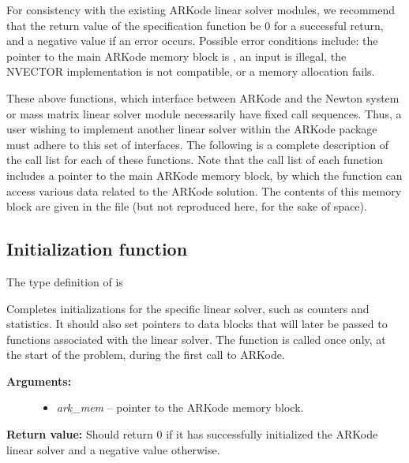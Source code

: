 \documentclass[letterpaper,10pt,english]{sphinxmanual}
\begin{document}
For consistency with the existing ARKode linear solver modules, we
recommend that the return value of the specification function be 0 for
a successful return, and a negative value if an error occurs.
Possible error conditions include: the pointer to the main ARKode
memory block is , an input is illegal, the NVECTOR
implementation is not compatible, or a memory allocation fails.

These above functions, which interface between ARKode and the Newton
system or mass matrix linear solver module necessarily have fixed call
sequences.  Thus, a user wishing to implement another linear solver
within the ARKode package must adhere to this set of interfaces.  The
following is a complete description of the call list for each of these
functions.  Note that the call list of each function includes a pointer
to the main ARKode memory block, by which the function can access
various data related to the ARKode solution. The contents of this
memory block are given in the file  (but not
reproduced here, for the sake of space).


\subsection{Initialization function}
\label{linear_solvers/custom:initialization-function}
The type definition of {\hyperref[linear_solvers/custom:c.linit]{\emph{}}} is

\begin{fulllineitems}
\label{linear_solvers/custom:c.linit}
Completes initializations for the specific linear solver, such as
counters and statistics.  It should also set pointers to data
blocks that will later be passed to functions associated with the
linear solver.  The {\hyperref[linear_solvers/custom:c.linit]{\emph{}}} function is called once only,
at the start of the problem, during the first call to ARKode.
\begin{description}
\item[{\textbf{Arguments:}}] \leavevmode\begin{itemize}
\item {} 
\emph{ark\_mem} -- pointer to the ARKode memory block.

\end{itemize}

\end{description}

\textbf{Return value:}  Should return 0 if it has successfully
initialized the ARKode linear solver and a negative value
otherwise.

\end{fulllineitems}
\end{document}
